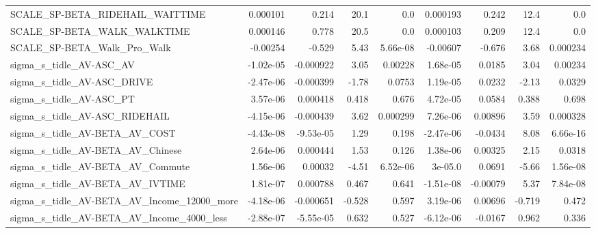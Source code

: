 \begin{tabular}{lrrrrrrrr}
SCALE\_SP-BETA\_RIDEHAIL\_WAITTIME                    &    0.000101 &        0.214 &      20.1 &      0.0 &   0.000193 &       0.242 &         12.4 &           0.0 \\
SCALE\_SP-BETA\_WALK\_WALKTIME                        &    0.000146 &        0.778 &      20.5 &      0.0 &   0.000103 &       0.209 &         12.4 &           0.0 \\
SCALE\_SP-BETA\_Walk\_Pro\_Walk                        &    -0.00254 &       -0.529 &      5.43 & 5.66e-08 &   -0.00607 &      -0.676 &         3.68 &      0.000234 \\
sigma\_s\_tidle\_AV-ASC\_AV                            &   -1.02e-05 &    -0.000922 &      3.05 &  0.00228 &   1.68e-05 &      0.0185 &         3.04 &       0.00234 \\
sigma\_s\_tidle\_AV-ASC\_DRIVE                         &   -2.47e-06 &    -0.000399 &     -1.78 &   0.0753 &   1.19e-05 &      0.0232 &        -2.13 &        0.0329 \\
sigma\_s\_tidle\_AV-ASC\_PT                            &    3.57e-06 &     0.000418 &     0.418 &    0.676 &   4.72e-05 &      0.0584 &        0.388 &         0.698 \\
sigma\_s\_tidle\_AV-ASC\_RIDEHAIL                      &   -4.15e-06 &    -0.000439 &      3.62 & 0.000299 &   7.26e-06 &     0.00896 &         3.59 &      0.000328 \\
sigma\_s\_tidle\_AV-BETA\_AV\_COST                      &   -4.43e-08 &    -9.53e-05 &      1.29 &    0.198 &  -2.47e-06 &     -0.0434 &         8.08 &      6.66e-16 \\
sigma\_s\_tidle\_AV-BETA\_AV\_Chinese                   &    2.64e-06 &     0.000444 &      1.53 &    0.126 &   1.38e-06 &     0.00325 &         2.15 &        0.0318 \\
sigma\_s\_tidle\_AV-BETA\_AV\_Commute                   &    1.56e-06 &      0.00032 &     -4.51 & 6.52e-06 &    3e-05.0 &      0.0691 &        -5.66 &      1.56e-08 \\
sigma\_s\_tidle\_AV-BETA\_AV\_IVTIME                    &    1.81e-07 &     0.000788 &     0.467 &    0.641 &  -1.51e-08 &    -0.00079 &         5.37 &      7.84e-08 \\
sigma\_s\_tidle\_AV-BETA\_AV\_Income\_12000\_more         &   -4.18e-06 &    -0.000651 &    -0.528 &    0.597 &   3.19e-06 &     0.00696 &       -0.719 &         0.472 \\
sigma\_s\_tidle\_AV-BETA\_AV\_Income\_4000\_less          &   -2.88e-07 &    -5.55e-05 &     0.632 &    0.527 &  -6.12e-06 &     -0.0167 &        0.962 &         0.336 \\

\end{tabular}
